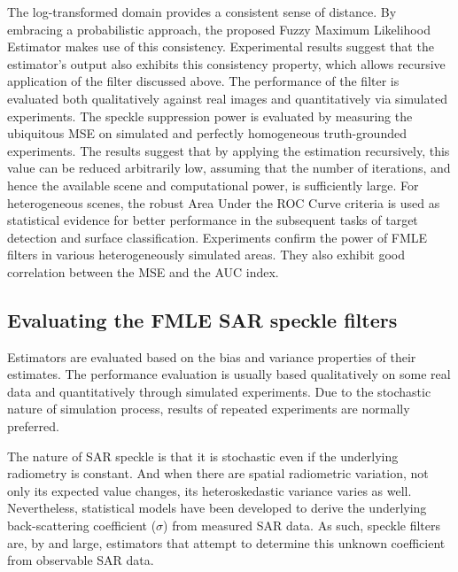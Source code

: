 The log-transformed domain provides a consistent sense of distance.
By embracing a probabilistic approach, the proposed Fuzzy Maximum Likelihood Estimator makes use of this consistency.
Experimental results suggest that the estimator's output also exhibits this consistency property, which allows recursive application of the filter discussed above.
The performance of the filter is evaluated both qualitatively against real images and quantitatively via simulated experiments.
The speckle suppression power is evaluated by measuring the ubiquitous MSE on simulated and perfectly homogeneous truth-grounded experiments.
The results suggest that by applying the estimation recursively, this value can be reduced arbitrarily low, assuming that the number of iterations, and hence the available scene and computational power, is sufficiently large.
For heterogeneous scenes, the robust Area Under the ROC Curve criteria is used as statistical evidence for better performance in the subsequent tasks of target detection and surface classification.
Experiments confirm the power of FMLE filters in various heterogeneously simulated areas.
They also exhibit good correlation between the MSE and the AUC index.

\subsection{Evaluating the FMLE SAR speckle filters}

Estimators are evaluated based on the bias and variance properties of their estimates. 
The performance evaluation is usually based qualitatively on some real data and quantitatively through simulated experiments. 
Due to the stochastic nature of simulation process, results of repeated experiments are normally preferred.

The nature of SAR speckle is that
	it is stochastic even if the underlying radiometry is constant. 
And when there are spatial radiometric variation, not only its expected value changes, its heteroskedastic variance varies as well.
Nevertheless, statistical models have been developed to derive the underlying back-scattering coefficient ($\sigma$) from measured SAR data. 
As such, speckle filters are, by and large, estimators that attempt to determine this unknown coefficient from observable SAR data. 

